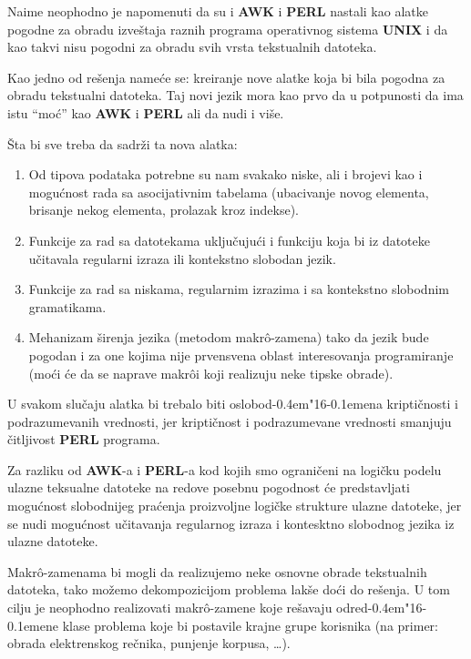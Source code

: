 \documentclass[12pt,a4paper]{article}
\def\d{d\kern-0.4em\char"16\kern-0.1em}
\begin{document}
    Naime neophodno je napomenuti da su i {\bf AWK} i {\bf PERL} nastali kao
    alatke pogodne za obradu izve\v staja raznih programa operativnog sistema
    {\bf UNIX} i da kao takvi nisu pogodni za obradu svih vrsta tekstualnih
    datoteka.

    Kao jedno od re\v senja name\'ce se: kreiranje nove alatke koja bi bila
    pogodna za obradu tekstualni datoteka.
    Taj novi jezik mora kao prvo da u potpunosti da ima istu ``mo\'c'' kao
    {\bf AWK} i {\bf PERL} ali da nudi i vi\v se.

    \v Sta bi sve treba da sadr\v zi ta nova alatka:
    \begin{enumerate}
    \item
      Od tipova podataka potrebne su nam svakako niske, ali i brojevi kao i
      mogu\'cnost rada sa asocijativnim tabelama (ubacivanje novog elementa,
      brisanje nekog elementa, prolazak kroz indekse).
    \item
      Funkcije za rad sa datotekama uklju\v cuju\'ci i funkciju koja bi iz
      datoteke u\v citavala regularni izraza ili kontekstno slobodan jezik.
    \item
      Funkcije za rad sa niskama, regularnim izrazima i sa kontekstno
      slobo\-dnim gramatikama.
    \item
      Mehanizam \v sirenja jezika (metodom makr\^o-zamena) tako da jezik
      bude pogodan i za one kojima nije prvensvena oblast interesovanja
      programiranje (mo\'ci \'ce da se naprave makr\^oi koji realizuju neke
      tipske obrade).
    \end{enumerate}

    U svakom slu\v caju alatka bi trebalo biti oslobo\d ena kripti\v cnosti
    i podrazumevanih vrednosti, jer kripti\v cnost i podrazumevane vrednosti
    smanjuju \v citljivost {\bf PERL} programa.

    Za razliku od {\bf AWK}-a i {\bf PERL}-a kod kojih smo ograni\v ceni na
    logi\v cku podelu ulazne teksualne datoteke na redove posebnu pogodnost
    \'ce predstavljati mogu\'cnost slobodnijeg pra\'cenja proizvoljne
    logi\v cke strukture ulazne datoteke, jer se nudi mogu\'cnost
    u\v citavanja regularnog izraza i kontesktno slobodnog jezika iz ulazne
    datoteke.

    Makr\^o-zamenama bi mogli da realizujemo neke osnovne obrade tekstua\-lnih
    datoteka, tako mo\v zemo dekompozicijom problema lak\v se do\'ci do
    re\v senja.
    U tom cilju je neophodno realizovati makr\^o-zamene koje re\v savaju
    odre\d ene klase problema koje bi postavile krajne grupe korisnika
    (na primer: obrada elektrenskog re\v cnika, punjenje korpusa, \ldots).
\end{document}
